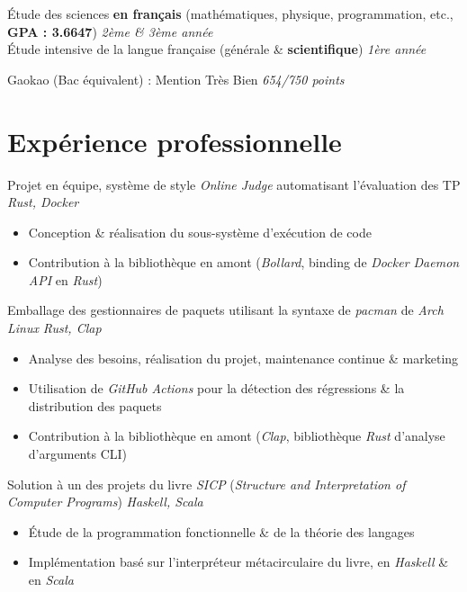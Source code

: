 \documentclass{resume}
\begin{document}
Étude des sciences \textbf{en français} {\footnotesize (mathématiques, physique, programmation, etc., \textbf{GPA : 3.6647})} \hfill \textit{2ème \& 3ème année} \\
Étude intensive de la langue française (générale \& \textbf{scientifique}) \hfill \textit{1ère année}

Gaokao (Bac équivalent) : Mention Très Bien \hfill \textit{654/750 points}


\section{Expérience professionnelle}
Projet en équipe, système de style \textit{Online Judge} automatisant l'évaluation des TP \hfill \textit{Rust, Docker}
\begin{itemize}
  \item Conception \& réalisation du sous-système d'exécution de code
  \item Contribution à la bibliothèque en amont (\textit{Bollard}, binding de \textit{Docker Daemon API} en \textit{Rust})
\end{itemize}

Emballage des gestionnaires de paquets utilisant la syntaxe de \textit{pacman} de \textit{Arch Linux} \hfill \textit{Rust, Clap}
\begin{itemize}
  \item Analyse des besoins, réalisation du projet, maintenance continue \& marketing
  \item Utilisation de \textit{GitHub Actions} pour la détection des régressions \& la distribution des paquets
  \item Contribution à la bibliothèque en amont (\textit{Clap}, bibliothèque \textit{Rust} d'analyse d'arguments CLI)
\end{itemize}

Solution à un des projets du livre \textit{SICP} (\textit{Structure and Interpretation of Computer Programs}) \hfill \textit{Haskell, Scala}
\begin{itemize}
  \item Étude de la programmation fonctionnelle \& de la théorie des langages
  \item Implémentation basé sur l'interpréteur métacirculaire du livre, en \textit{Haskell} \& en \textit{Scala}
\end{itemize}
\end{document}
